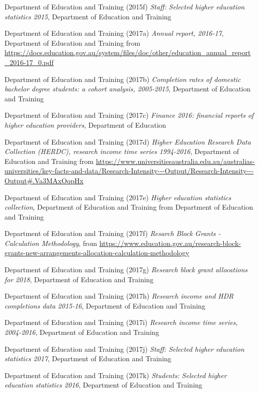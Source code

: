 \documentclass[]{book}
\begin{document}
Department of Education and Training (2015f) \emph{Staff: Selected higher education statistics 2015}, Department of Education and Training

\protect\hypertarget{_ENREF_67}{}{}Department of Education and Training (2017a) \emph{Annual report, 2016-17}, Department of Education and Training from \url{https://docs.education.gov.au/system/files/doc/other/education_annual_report_2016-17_0.pdf}

Department of Education and Training (2017b) \emph{Completion rates of domestic bachelor degree students: a cohort analysis, 2005-2015}, Department of Education and Training

Department of Education and Training (2017c) \emph{Finance 2016: financial reports of higher education providers}, Department of Education

Department of Education and Training (2017d) \emph{Higher Education Research Data Collection (HERDC), research income time series 1994-2016}, Department of Education and Training from \url{https://www.universitiesaustralia.edu.au/australias-universities/key-facts-and-data/Research-Intensity---Output/Research-Intensity---Output\#.Va3MAxOqpHx}

Department of Education and Training (2017e) \emph{Higher education statistics collection}, Department of Education and Training from Department of Education and Training

Department of Education and Training (2017f) \emph{Resarch Block Grants - Calculation Methodology}, from \url{https://www.education.gov.au/research-block-grants-new-arrangements-allocation-calculation-methodology}

Department of Education and Training (2017g) \emph{Research block grant allocations for 2018}, Department of Education and Training

Department of Education and Training (2017h) \emph{Research income and HDR completions data 2015-16}, Department of Education and Training

\protect\hypertarget{_ENREF_75}{}{}Department of Education and Training (2017i) \emph{Research income time series, 2004-2016}, Department of Education and Training

\protect\hypertarget{_ENREF_76}{}{}Department of Education and Training (2017j) \emph{Staff: Selected higher education statistics 2017}, Department of Education and Training

\protect\hypertarget{_ENREF_77}{}{}Department of Education and Training (2017k) \emph{Students: Selected higher education statistics 2016}, Department of Education and Training
\end{document}
